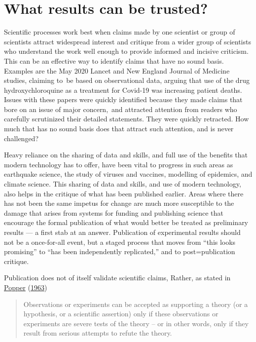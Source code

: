 \documentclass[
  10pt,
  b5paper]{book}
\begin{document}
\hypertarget{what-results-can-be-trusted}{%
\section{What results can be trusted?}\label{what-results-can-be-trusted}}

Scientific processes work best when claims made by one scientist
or group of scientists attract widespread interest and critique
from a wider group of scientists who understand the work well
enough to provide informed and incisive criticism. This can be
an effective way to identify claims that have no sound basis.
Examples are the May 2020 Lancet and New England Journal of
Medicine studies, claiming to~be based on observational data,
arguing that use of the drug hydroxychloroquine as a treatment
for Covid-19 was increasing patient deaths.\\
Issues with these papers were quickly identified because they
made claims that bore on an issue of major concern,~and attracted
attention from readers who carefully scrutinized their detailed
statements. They were quickly retracted. How much that has no
sound basis does that attract such attention, and is never
challenged?

Heavy reliance on the sharing of data and skills, and full use of
the benefits that modern technology has to offer, have been vital
to progress in such areas as earthquake science, the study of
viruses and vaccines, modelling of epidemics, and climate science.
This sharing of data and skills, and use of modern technology, also
helps in the critique of what has been published earlier.
Areas where there has not been the same impetus for change are much
more susceptible to the damage that arises from systems for funding
and publishing science that encourage the formal publication of
what would better be treated as preliminary results --- a first
stab at an answer. Publication of experimental results should not
be a once-for-all event, but a staged process that moves from
``this looks promising'' to ``has been independently replicated,''
and to post=publication critique.

Publication does not of itself validate scientific claims,
Rather, as stated in \protect\hyperlink{ref-popper_1963}{Popper} (\protect\hyperlink{ref-popper_1963}{1963})

\begin{quote}
Observations or experiments can be accepted as supporting a theory (or a hypothesis, or a scientific assertion) only if these observations or experiments are severe tests of the theory -- or in other words, only if they result from serious attempts to refute the theory.
\end{quote}
\end{document}
